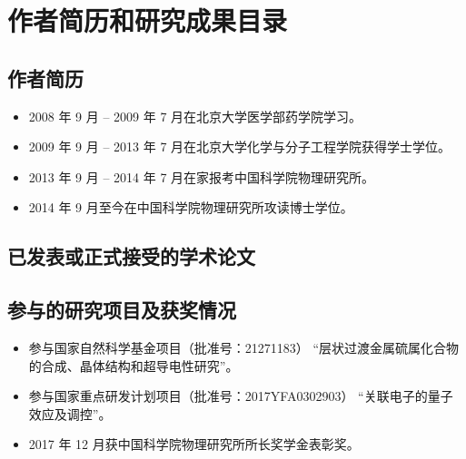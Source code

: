 
\chapter{作者简历和研究成果目录}

\section*{作者简历}
\begin{itemize}[leftmargin = \parindent]
\item 2008 年 9 月 -- 2009 年 7 月在北京大学医学部药学院学习。
\item 2009 年 9 月 -- 2013 年 7 月在北京大学化学与分子工程学院获得学士学位。
\item 2013 年 9 月 -- 2014 年 7 月在家报考中国科学院物理研究所。
\item 2014 年 9 月至今在中国科学院物理研究所攻读博士学位。
\end{itemize}

\section*{已发表或正式接受的学术论文}
%
	{\begin{itemize}[leftmargin = \parindent]}{\end{itemize}}{\item}
\begin{refsection}
\renewcommand*{\bibfont}{}
\nocite{liu2017, liu2018}
\begin{refcontext}[sorting = none]
\printbibliography[heading = none, env = publications]
\end{refcontext}
\end{refsection}

\section*{参与的研究项目及获奖情况}
\begin{itemize}[leftmargin = \parindent]
\item 参与国家自然科学基金项目（批准号：21271183）
	“层状过渡金属硫属化合物的合成、晶体结构和超导电性研究”。
\item 参与国家重点研发计划项目（批准号：2017YFA0302903）
	“关联电子的量子效应及调控”。
\item 2017 年 12 月获中国科学院物理研究所所长奖学金表彰奖。
\end{itemize}

